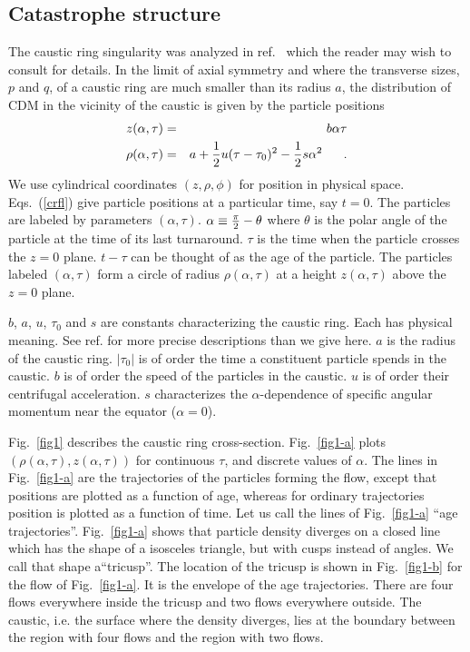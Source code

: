 \documentclass[aps,prd,preprint,tightenlines,floatfix,showpacs,groupedaddress]{revtex4}
\begin{document}
\subsection{Catastrophe structure}

The caustic ring singularity was analyzed in ref.~\cite{sing} which
the reader may wish to consult for details.  In the limit of axial 
symmetry and where the transverse sizes, $p$ and $q$, of a caustic 
ring are much smaller than its radius $a$, the distribution of CDM 
in the vicinity of the caustic is given by the particle positions
\begin{eqnarray}
z(\alpha, \tau) &=& b \alpha \tau  \nonumber\\
\rho(\alpha, \tau) &=& a + {1 \over 2} u (\tau - \tau_0)^2
- {1 \over 2} s \alpha^2~~~~\ .
\label{crfl}
\end{eqnarray}
We use cylindrical coordinates $(z, \rho, \phi)$ for position 
in physical space.  Eqs.~(\ref{crfl}) give particle positions 
at a particular time, say $t=0$.  The particles are labeled by 
parameters $(\alpha, \tau)$.  $\alpha \equiv {\pi \over 2} - \theta$ 
where $\theta$ is the polar angle of the particle at the time of its 
last turnaround.  $\tau$ is the time when the particle crosses 
the $z = 0$ plane.  $t - \tau$ can be thought of as the age of
the particle.  The particles labeled $(\alpha, \tau)$ form a 
circle of radius $\rho(\alpha, \tau)$ at a height $z(\alpha, \tau)$ 
above the $z = 0$ plane.  

$b$, $a$, $u$, $\tau_0$ and $s$ are constants characterizing the caustic
ring.  Each has physical meaning.  See ref. \cite{sing} for more precise
descriptions than we give here. $a$ is the radius of the caustic ring.
$|\tau_0|$ is of order the time a constituent particle spends in the
caustic.  $b$ is of order the speed of the particles in the caustic. 
$u$ is of order their centrifugal acceleration. $s$ characterizes the
$\alpha$-dependence of specific angular momentum near the equator 
($\alpha = 0$).

Fig.~\ref{fig1} describes the caustic ring cross-section.  Fig.~\ref{fig1-a}
plots $(\rho(\alpha, \tau), z(\alpha, \tau))$ for continuous $\tau$, 
and discrete values of $\alpha$.  The lines in Fig.~\ref{fig1-a} are 
the trajectories of the particles forming the flow, except that 
positions are plotted as a function of age, whereas for ordinary 
trajectories position is plotted as a function of time.  Let 
us call the lines of Fig.~\ref{fig1-a} ``age trajectories''.  
Fig.~\ref{fig1-a} shows that particle density diverges on a 
closed line which has the shape of a isosceles triangle, but 
with cusps instead of angles.  We call that shape a``tricusp''.  
The location of the tricusp is shown in Fig.~\ref{fig1-b} for 
the flow of Fig.~\ref{fig1-a}.  It is the envelope of the age 
trajectories.  There are four flows everywhere inside the tricusp 
and two flows everywhere outside.  The caustic, i.e. the surface 
where the density diverges, lies at the boundary between the region 
with four flows and the region with two flows.
\end{document}
